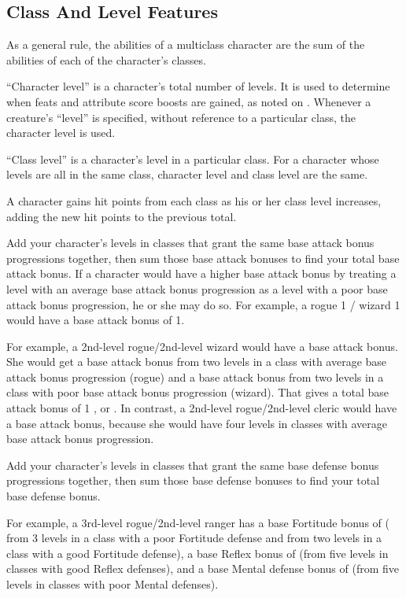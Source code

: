 \subsection{Class And Level Features}
As a general rule, the abilities of a multiclass character are the sum
of the abilities of each of the character's classes.

``Character level'' is a character's total number of levels.
It is used to determine when feats and attribute score boosts are gained, as noted on .
Whenever a creature's ``level'' is specified, without reference to a particular class, the character level is used.

\par ``Class level'' is a character's level in a particular class.
For a character whose levels are all in the same class, character level and class level are the same.

A character gains hit points from each class as his or her class level increases, adding the new hit points to the previous total.

Add your character's levels in classes that grant the same base attack bonus progressions together, then sum those base attack bonuses to find your total base attack bonus.
If a character would have a higher base attack bonus by treating a level with an average base attack bonus progression as a level with a poor base attack bonus progression, he or she may do so.
For example, a rogue 1 / wizard 1 would have a base attack bonus of 1.

\par For example, a 2nd-level rogue/2nd-level wizard would have a  base attack bonus.
She would get a  base attack bonus from two levels in a class with average base attack bonus progression (rogue) and a  base attack bonus from two levels in a class with poor base attack bonus progression (wizard).
That gives a total base attack bonus of 1 , or .
In contrast, a 2nd-level rogue/2nd-level cleric would have a  base attack bonus, because she would have four levels in classes with average base attack bonus progression.

Add your character's levels in classes that grant the same base defense bonus progressions together, then sum those base defense bonuses to find your total base defense bonus.

\par For example, a 3rd-level rogue/2nd-level ranger has a base Fortitude bonus of  ( from 3 levels in a class with a poor Fortitude defense and  from two levels in a class with a good Fortitude defense), a base Reflex bonus of  (from five levels in classes with good Reflex defenses), and a base Mental defense bonus of  (from five levels in classes with poor Mental defenses).

